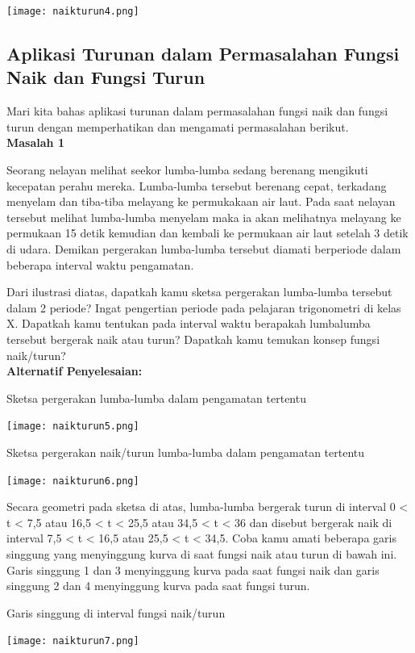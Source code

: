 \documentclass[11pt,fleqn]{book} %
\begin{document}
\texttt{[image: naikturun4.png]}

\subsection{Aplikasi Turunan dalam Permasalahan Fungsi Naik dan Fungsi Turun}

Mari kita bahas aplikasi turunan dalam permasalahan fungsi naik dan fungsi turun dengan memperhatikan dan mengamati permasalahan berikut.\\

\textbf{Masalah 1}

Seorang nelayan melihat seekor lumba-lumba sedang berenang mengikuti kecepatan perahu mereka. Lumba-lumba tersebut berenang cepat, terkadang menyelam dan tiba-tiba melayang ke permukakaan air laut. Pada saat nelayan tersebut melihat lumba-lumba menyelam maka ia akan melihatnya melayang ke permukaan 15 detik kemudian dan kembali ke permukaan air laut setelah 3 detik di udara. Demikan pergerakan lumba-lumba tersebut diamati berperiode dalam beberapa interval waktu pengamatan.

Dari ilustrasi diatas, dapatkah kamu sketsa pergerakan lumba-lumba tersebut dalam 2 periode? Ingat pengertian periode pada pelajaran trigonometri di kelas X. Dapatkah kamu tentukan pada interval waktu berapakah lumbalumba tersebut bergerak naik atau turun? Dapatkah kamu temukan konsep fungsi naik/turun?\\

\textbf{Alternatif Penyelesaian:}

Sketsa pergerakan lumba-lumba dalam pengamatan tertentu

\texttt{[image: naikturun5.png]}

Sketsa pergerakan naik/turun lumba-lumba dalam pengamatan tertentu

\texttt{[image: naikturun6.png]}

Secara geometri pada sketsa di atas, lumba-lumba bergerak turun di interval 0 < t < 7,5 atau 16,5 < t < 25,5 atau 34,5 < t < 36 dan disebut bergerak naik di interval 7,5 < t < 16,5 atau 25,5 < t < 34,5.
Coba kamu amati beberapa garis singgung yang menyinggung kurva di saat fungsi naik atau turun di bawah ini. Garis singgung 1 dan 3 menyinggung kurva pada saat fungsi naik dan garis singgung 2 dan 4 menyinggung kurva pada saat fungsi turun.

Garis singgung di interval fungsi naik/turun

\texttt{[image: naikturun7.png]}
\end{document}
